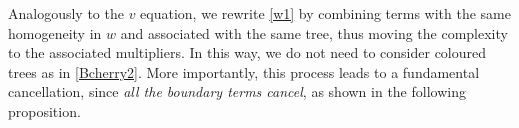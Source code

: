 \documentclass[%
11pt,  reqno]{amsart}
\makeatletter
\newcommand{\5}{\textup{V}}
\newcommand{\noi}{\noindent}
\newcommand{\ind}{\mathbbm 1}
\theoremstyle{remark}
\newcommand{\TT}{\mathcal{T}}
\newcommand{\G}{\Gamma}
\DeclareMathOperator{\mulB}{mul_{\mathcal{B}}}
\def\<#1>{\csname MH@symb@#1\endcsname}
\def\distC{15}
\newcommand{\cherry}[3]{
	\begin{tikzpicture}[
		baseline=-8, scale=0.6, every node/.style={dotA},
		level distance=15pt,
		level 1/.style={sibling distance=\distC pt}
		]
		\node  [label=above:{$#1$}]  (root) {}
		child
		child
		;
		\node [label= left:{$#2$}]  at (root-1) {};
		\node [label= right:{$#3$}] at (root-2) {};
	\end{tikzpicture}
}
\newcommand{\B}{\mathcal{B}}
\numberwithin{equation}{section}
\numberwithin{theorem}{section}
\newcommand{\D}{\mathrm{D}}
\makeatother
\begin{document}
\noi Analogously to the $v$ equation, we rewrite \eqref{w1} by combining terms with the same homogeneity in $w$ and associated with the same tree, thus moving the complexity to the associated multipliers. In this way, we do not need to consider coloured trees as in \eqref{Bcherry2}. More importantly, this process leads to a fundamental cancellation, since \textit{all the boundary terms cancel}, as shown in the following proposition.



\end{document}
